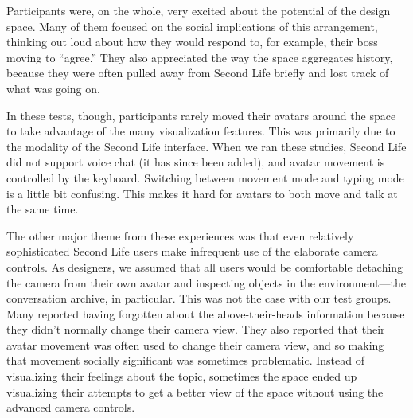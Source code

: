 Participants were, on the whole, very excited about the potential of the design space. Many of them focused on the social implications of this arrangement, thinking out loud about how they would respond to, for example, their boss moving to ``agree.'' They also appreciated the way the space aggregates history, because they were often pulled away from Second Life briefly and lost track of what was going on.

In these tests, though, participants rarely moved their avatars around the space to take advantage of the many visualization features. This was primarily due to the modality of the Second Life interface. When we ran these studies, Second Life did not support voice chat (it has since been added), and avatar movement is controlled by the keyboard. Switching between movement mode and typing mode is a little bit confusing. This makes it hard for avatars to both move and talk at the same time.


The other major theme from these experiences was that even relatively sophisticated Second Life users make infrequent use of the elaborate camera controls. As designers, we assumed that all users would be comfortable detaching the camera from their own avatar and inspecting objects in the environment---the conversation archive, in particular. This was not the case with our test groups. Many reported having forgotten about the above-their-heads information because they didn't normally change their camera view. They also reported that their avatar movement was often used to change their camera view, and so making that movement socially significant was sometimes problematic. Instead of visualizing their feelings about the topic, sometimes the space ended up visualizing their attempts to get a better view of the space without using the advanced camera controls.

